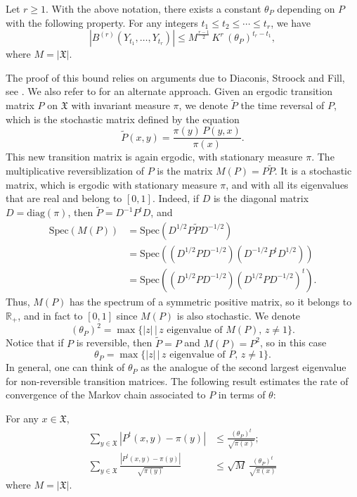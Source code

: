 \documentclass[envcountsame]{svmult}
\newcommand{\R}{\mathbb{R}}
\newcommand{\spa}{\mathfrak{X}}
\begin{document}
\begin{proposition}\label{prop:Bound_Boolean}
  Let $r\geq 1$. With the above notation, there exists a constant $\theta_{P}$ depending on $P$
  with the following property.
  For any integers $t_1 \le t_2 \le \cdots \le t_r$, we have
  \[ \left|B^{(r)}(Y_{t_1},\ldots,Y_{t_r}) \right| \le M^{\frac{r-1}{2}} \,K^r\, (\theta_P)^{t_r-t_1},\]
  where $M = |\spa|$.
\end{proposition}
The proof of this bound relies on arguments due to Diaconis, Stroock and Fill, see \cite{DS91,Fil91}.
We also refer to \cite[Section 4.1]{LivreOrange:Cumulants} for an alternate approach.
Given an ergodic transition matrix $P$ on $\spa$ with invariant measure $\pi$, we denote $\widetilde{P}$ the time reversal of $P$, which is the stochastic matrix defined by the equation
$$\widetilde{P}(x,y) = \frac{\pi(y)\,P(y,x)}{\pi(x)}.$$
This new transition matrix is again ergodic, with stationary measure $\pi$. The multiplicative reversiblization of $P$ is the matrix $M(P)=P\widetilde{P}$. It is a stochastic matrix, which is ergodic with stationary measure $\pi$, and with all its eigenvalues that are real and belong to $[0,1]$. Indeed, if $D$ is the diagonal matrix $D = \mathrm{diag}(\pi)$, then $\widetilde{P} = D^{-1}P^tD$, and
\begin{align*}
\mathrm{Spec}(M(P)) &= \mathrm{Spec}\left(D^{1/2}P\widetilde{P}D^{-1/2}\right) \\
&= \mathrm{Spec}\left((D^{1/2}PD^{-1/2})(D^{-1/2}P^t D^{1/2})\right) \\
&= \mathrm{Spec}\left((D^{1/2}PD^{-1/2})(D^{1/2}PD^{-1/2})^t\right).
\end{align*}
Thus, $M(P)$ has the spectrum of a symmetric positive matrix, so it belongs to $\R_+$, and in fact to $[0,1]$ since $M(P)$ is also stochastic. We denote 
\begin{equation}
  (\theta_P)^2 = \max\{|z|\,|\,z \text{ eigenvalue of }M(P),\,z \neq 1\}.
  \label{eq:def_thetaP}
\end{equation}
Notice that if $P$ is reversible, then $\widetilde{P}=P$ and $M(P)=P^2$, so in this case 
$$ \theta_P=\max\{|z|\,|\,z \text{ eigenvalue of }P,\,z \neq 1\}. $$ 
In general, one can think of $\theta_P$ as the analogue of the second largest eigenvalue for non-reversible transition matrices. The following result estimates the rate of convergence of the Markov chain associated to $P$ in terms of $\theta$:
\begin{theorem}[Fill, 1991]\label{thm:fill}
For any $x \in \spa$,
\begin{align*}
\sum_{y \in \spa} |P^t(x,y)-\pi(y)| &\leq \frac{(\theta_P)^t}{\sqrt{\pi(x)}}; \\
\sum_{y \in \spa} \frac{|P^t(x,y)-\pi(y)|}{\sqrt{\pi(y)}} &\leq \sqrt{M}\,\frac{(\theta_P)^t}{\sqrt{\pi(x)}}
\end{align*}
where $M = |\spa|$.
\end{theorem}
\end{document}
